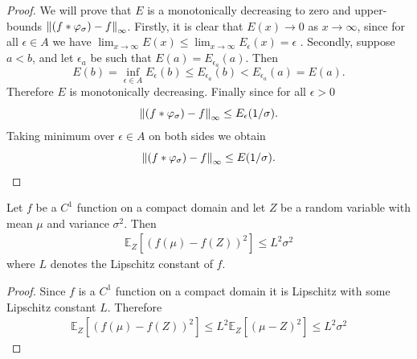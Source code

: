 \begin{proof}
    We will prove that $E$ is a monotonically decreasing to zero and upper-bounds $\left\lVert (f \ast \varphi_\sigma) - f \right\rVert_{\infty}$.
    Firstly, it is clear that $E(x) \to 0$ as $x \to \infty$, since for all $\epsilon \in A$ we have $\lim_{x \to \infty} E(x) \leq \lim_{x \to \infty} E_{\epsilon}(x)=\epsilon$ . 
    Secondly, suppose $a < b$, and let $\epsilon_a$ be such that $E(a) = E_{\epsilon_a}(a)$. Then
    $$E(b) = \inf_{\epsilon \in A} E_{\epsilon}(b) \leq E_{\epsilon_a}(b) < E_{\epsilon_a}(a) = E(a).$$
    Therefore $E$ is monotonically decreasing.
    Finally since for all $\epsilon > 0$
    $$ \left\lVert (f \ast \varphi_\sigma) - f \right\rVert_{\infty} \leq E_{\epsilon}(1/\sigma). $$
    Taking minimum over $\epsilon \in A$ on both sides we obtain 
    $$ \left\lVert (f \ast \varphi_\sigma) - f \right\rVert_{\infty} \leq E(1/\sigma). $$
\end{proof}


\begin{lemma}
    \label{ch2:lemma:_Lpz}
    Let $f$ be a $C^1$ function on a compact domain and let $Z$ be a random variable with mean $\mu$ and variance $\sigma^2$.
    Then
    \begin{gather*}
        \mathbb{E}_Z[(f(\mu) - f(Z))^2] \leq L^2 \sigma^2
    \end{gather*}
    where $L$ denotes the Lipschitz constant of $f$.
\end{lemma}
\begin{proof}
Since  $f$ is a $C^1$ function on a compact domain it is Lipschitz with some Lipschitz constant $L$. Therefore
\begin{align*}
    \mathbb{E}_Z[(f(\mu) - f(Z))^2] 
    \leq L^2\mathbb{E}_Z[(\mu - Z)^2]
    \leq L^2 \sigma^2
\end{align*}    
\end{proof}

